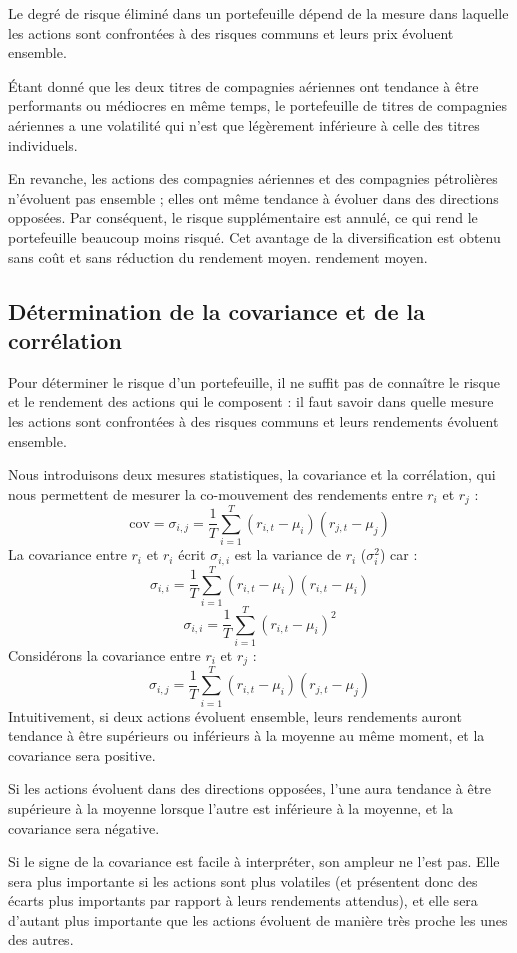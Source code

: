 \documentclass[a4paper, 12pt]{report}
\begin{document}
Le degré de risque éliminé dans un portefeuille dépend de la mesure dans laquelle les actions sont confrontées à des risques communs et leurs prix évoluent ensemble.

Étant donné que les deux titres de compagnies aériennes ont tendance à être performants ou médiocres en même temps, le portefeuille de titres de compagnies aériennes a une volatilité qui n'est que légèrement inférieure à celle des titres individuels.

En revanche, les actions des compagnies aériennes et des compagnies pétrolières n'évoluent pas ensemble ; elles ont même tendance à évoluer dans des directions opposées. Par conséquent, le risque supplémentaire est annulé, ce qui rend le portefeuille beaucoup moins risqué. Cet avantage de la diversification est obtenu sans coût et sans réduction du rendement moyen.
rendement moyen.

\subsection{Détermination de la covariance et de la corrélation}

Pour déterminer le risque d'un portefeuille, il ne suffit pas de connaître le risque et le rendement des actions qui le composent : il faut savoir dans quelle mesure les actions sont confrontées à des risques communs et leurs rendements évoluent ensemble.

Nous introduisons deux mesures statistiques, la covariance et la corrélation, qui nous permettent de mesurer la co-mouvement des rendements entre $r_i$ et $r_j$ :
$$
\text{cov}=\sigma_{i,j}=\frac{1}{T}\sum_{i=1}^{T}(r_{i,t}-\mu_i)(r_{j,t}-\mu_j)
$$
La covariance entre $r_i$ et $r_i$ écrit $\sigma_{i,i}$ est la variance de $r_i$ ($\sigma_{i}^2$) car :
$$
\sigma_{i,i}=\frac{1}{T}\sum_{i=1}^{T}(r_{i,t}-\mu_i)(r_{i,t}-\mu_i)
$$
$$
\sigma_{i,i}=\frac{1}{T}\sum_{i=1}^{T}(r_{i,t}-\mu_i)^2
$$
Considérons la covariance entre $r_i$ et $r_j$ :
$$
\sigma_{i,j}=\frac{1}{T}\sum_{i=1}^{T}(r_{i,t}-\mu_i)(r_{j,t}-\mu_j)
$$
Intuitivement, si deux actions évoluent ensemble, leurs rendements auront tendance à être supérieurs ou inférieurs à la moyenne au même moment, et la covariance sera positive.

Si les actions évoluent dans des directions opposées, l'une aura tendance à être supérieure à la moyenne lorsque l'autre est inférieure à la moyenne, et la covariance sera négative.

Si le signe de la covariance est facile à interpréter, son ampleur ne l'est pas. Elle sera plus importante si les actions sont plus volatiles (et présentent donc des écarts plus importants par rapport à leurs rendements attendus), et elle sera d'autant plus importante que les actions évoluent de manière très proche les unes des autres.
\end{document}
